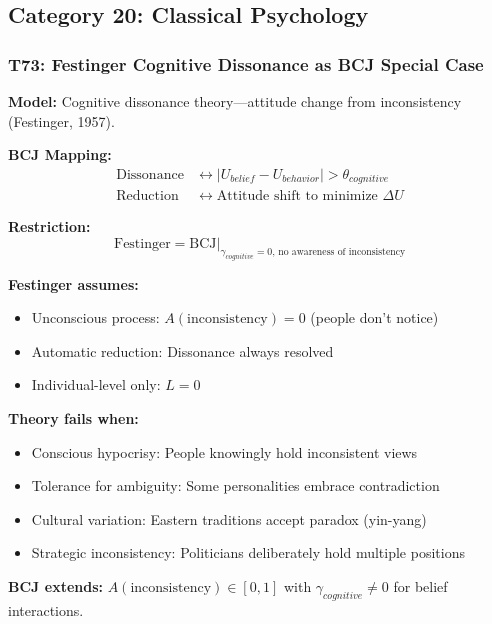 \subsection{Category 20: Classical Psychology}

\subsubsection*{T73: Festinger Cognitive Dissonance as BCJ Special Case}

\textbf{Model:} Cognitive dissonance theory---attitude change from inconsistency (Festinger, 1957).

\textbf{BCJ Mapping:}
\begin{align}
\text{Dissonance} &\leftrightarrow |U_{belief} - U_{behavior}| > \theta_{cognitive} \\
\text{Reduction} &\leftrightarrow \text{Attitude shift to minimize } \Delta U
\end{align}

\textbf{Restriction:}
\begin{equation}
\boxed{\text{Festinger} = \text{BCJ} \big|_{\gamma_{cognitive} = 0, \, \text{no awareness of inconsistency}}}
\end{equation}

\begin{tcolorbox}[colback=red!5!white, colframe=red!75!black,
    title=Boundary Condition: Where Festinger Fails]
\textbf{Festinger assumes:}
\begin{itemize}[nosep]
\item Unconscious process: $A(\text{inconsistency}) = 0$ (people don't notice)
\item Automatic reduction: Dissonance always resolved
\item Individual-level only: $L = 0$
\end{itemize}

\textbf{Theory fails when:}
\begin{itemize}[nosep]
\item Conscious hypocrisy: People knowingly hold inconsistent views
\item Tolerance for ambiguity: Some personalities embrace contradiction
\item Cultural variation: Eastern traditions accept paradox (yin-yang)
\item Strategic inconsistency: Politicians deliberately hold multiple positions
\end{itemize}

\textbf{BCJ extends:} $A(\text{inconsistency}) \in [0,1]$ with $\gamma_{cognitive} \neq 0$ for belief interactions.
\end{tcolorbox}

